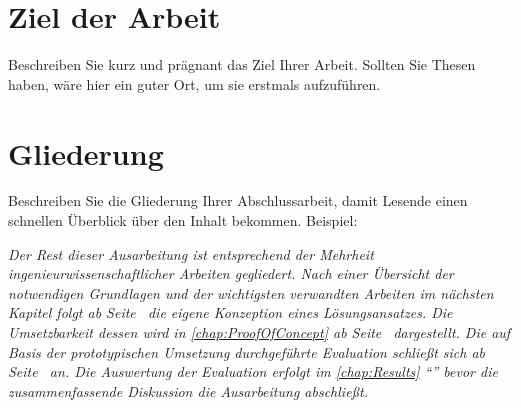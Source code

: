 \section{Ziel der Arbeit}\label{sec:Intro:Goal}
Beschreiben Sie kurz und prägnant das Ziel Ihrer Arbeit. Sollten Sie Thesen haben, wäre hier ein guter Ort, um sie erstmals aufzuführen.



\section{Gliederung}\label{sec:Intro:Structure}
Beschreiben Sie die Gliederung Ihrer Abschlussarbeit, damit Lesende einen schnellen Überblick über den Inhalt bekommen. Beispiel:

\emph{Der Rest dieser Ausarbeitung ist entsprechend der Mehrheit ingenieurwissenschaftlicher Arbeiten gegliedert. Nach einer Übersicht der notwendigen Grundlagen und der wichtigsten verwandten Arbeiten im nächsten Kapitel folgt ab Seite~\pageref{chap:Concept} die eigene Konzeption eines Lösungsansatzes. Die Umsetzbarkeit dessen wird in \autoref{chap:ProofOfConcept} ab Seite~\pageref{chap:ProofOfConcept} dargestellt. Die auf Basis der prototypischen Umsetzung durchgeführte Evaluation schließt sich ab Seite~\pageref{chap:Evaluation} an. Die Auswertung der Evaluation erfolgt im \autoref{chap:Results} \enquote{} bevor die zusammenfassende Diskussion die Ausarbeitung abschließt.}